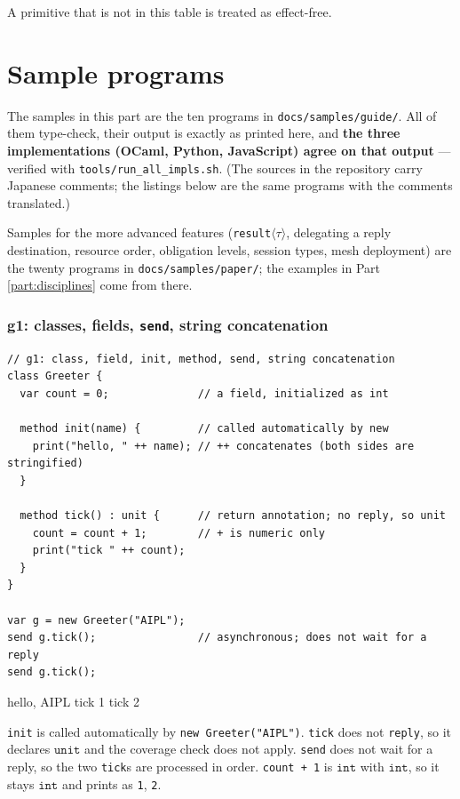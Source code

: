 \documentclass[11pt,a4paper]{article}
\newcommand{\ty}[1]{\ensuremath{\mathtt{#1}}}
\begin{document}
A primitive that is not in this table is treated as effect-free.

\part{Sample programs}
\label{part:sample}

The samples in this part are the ten programs in \texttt{docs/samples/guide/}.
All of them type-check, their output is exactly as printed here, and
\textbf{the three implementations (OCaml, Python, JavaScript) agree on that
output} --- verified with \texttt{tools/run\_all\_impls.sh}.
(The sources in the repository carry Japanese comments; the listings below are
the same programs with the comments translated.)

Samples for the more advanced features (\texttt{result}$\langle\tau\rangle$,
delegating a reply destination, resource order, obligation levels, session
types, mesh deployment) are the twenty programs in
\texttt{docs/samples/paper/}; the examples in Part \ref{part:disciplines} come
from there.

\section{g1: classes, fields, \texttt{send}, string concatenation}

\begin{lstlisting}
// g1: class, field, init, method, send, string concatenation
class Greeter {
  var count = 0;              // a field, initialized as int

  method init(name) {         // called automatically by new
    print("hello, " ++ name); // ++ concatenates (both sides are stringified)
  }

  method tick() : unit {      // return annotation; no reply, so unit
    count = count + 1;        // + is numeric only
    print("tick " ++ count);
  }
}

var g = new Greeter("AIPL");
send g.tick();                // asynchronous; does not wait for a reply
send g.tick();
\end{lstlisting}

\begin{term}
hello, AIPL
tick 1
tick 2
\end{term}

\texttt{init} is called automatically by \texttt{new Greeter("AIPL")}.
\texttt{tick} does not \texttt{reply}, so it declares \ty{unit} and the
coverage check does not apply. \texttt{send} does not wait for a reply, so the
two \texttt{tick}s are processed in order. \texttt{count + 1} is \ty{int} with
\ty{int}, so it stays \ty{int} and prints as \texttt{1}, \texttt{2}.
\end{document}
